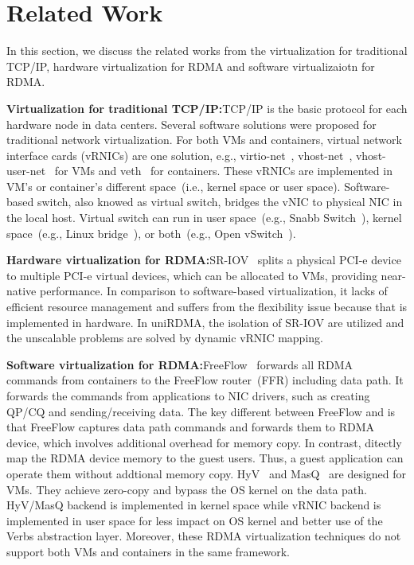 \section{Related Work} \label{relatedwork}

In this section, we discuss the related works from the virtualization for traditional TCP/IP, hardware virtualization for RDMA and software virtualizaiotn for RDMA.

\textbf{Virtualization for traditional TCP/IP:}\quad TCP/IP is the basic protocol for each hardware node in data centers. Several software solutions were proposed for traditional network virtualization. For both VMs and containers, virtual network interface cards (vRNICs) are one solution, e.g., virtio-net~\cite{virtio-russell2008}, vhost-net~\cite{vhost-net},  vhost-user-net~\cite{vhost-user-net} for VMs and veth~\cite{veth} for containers. These vRNICs are implemented in VM's or container's different space~(i.e., kernel space or user space). Software-based switch, also knowed as virtual switch, bridges the vNIC to physical NIC in the local host. Virtual switch can run in user space~(e.g., Snabb Switch~\cite{snabb}), kernel space~(e.g., Linux bridge~\cite{linux-bridge}), or both~(e.g., Open vSwitch~\cite{ovs-2015}). 

\textbf{Hardware virtualization for RDMA:}\quad SR-IOV~\cite{sr-iov} splits a physical PCI-e device to multiple PCI-e virtual devices, which can be allocated to VMs, providing near-native performance. In comparison to software-based virtualization, it lacks of efficient resource management and suffers from the flexibility issue because that is implemented in hardware. In uniRDMA, the isolation of SR-IOV are utilized and the unscalable problems are solved by dynamic vRNIC mapping. 

\textbf{Software virtualization for RDMA:}\quad FreeFlow~\cite{kim2019freeflow} forwards all RDMA commands from containers to the FreeFlow router~(FFR) including data path. It forwards the commands from applications to NIC drivers, such as creating QP/CQ and sending/receiving data. The key different between FreeFlow and \sys is that FreeFlow captures data path commands and forwards them to RDMA device, which involves additional overhead for memory copy. In contrast, \sys ditectly map the RDMA device memory to the guest users. Thus, a guest application can operate them without addtional memory copy. HyV~\cite{pfefferle2015hybrid} and MasQ~\cite{he2020masq} are designed for VMs. They achieve zero-copy and bypass the OS kernel on the data path. HyV/MasQ backend is implemented in kernel space while \sys vRNIC backend is implemented in user space for less impact on OS kernel and better use of the Verbs abstraction layer. Moreover, these RDMA virtualization techniques do not support both VMs and containers in the same framework. 